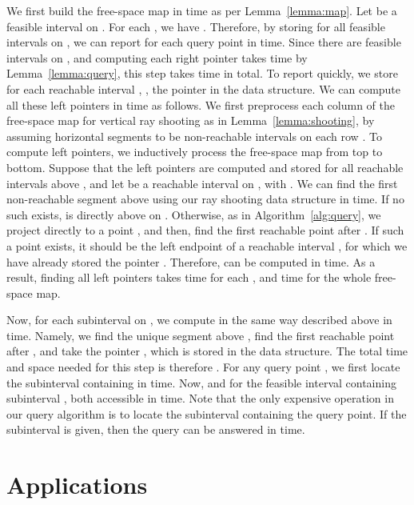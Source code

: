\documentclass[12pt]{dalthesis}
\def\favoritefont{\bfseries \sffamily}
\def\QED{\ensuremath{{\Box}}}
\def\markatright#1{\leavevmode\unskip\nobreak\quad\hspace*{\fill}{#1}}
\newenvironment{proof}
	{\begin{trivlist}\item[\hskip\labelsep{\favoritefont Proof:}]}
	{\markatright{\QED}\end{trivlist}}
\newcommand{\qed}{}
\newcommand{\fs}{free-space }
\begin{document}
\begin{proof}
	We first build the \fs map in  time as per Lemma~\ref{lemma:map}.
	Let  be a feasible interval on .
	For each , we have .
	Therefore, by storing  for all feasible intervals  on ,
	we can report  for each query point  in  time.
	Since there are  feasible intervals on ,
	and computing each right pointer takes  time by Lemma~\ref{lemma:query},
	this step takes  time in total.
	To report  quickly, we store for each reachable interval ,
	, the pointer  in the data structure.
	We can compute all these left pointers in  time as follows.
	We first preprocess each column of the \fs map
	for vertical ray shooting as in Lemma~\ref{lemma:shooting},
	by assuming horizontal segments 
	to be non-reachable intervals on each row . 
	To compute left pointers, we inductively process 
	the \fs map from top to bottom.
	Suppose that the left pointers are computed and stored for 
	all reachable intervals above ,
	and let  be a reachable interval on ,
	with .
	We can find the first non-reachable segment 
	above  using our ray shooting data structure in  time.
	If no such  exists,  is directly above  on .
	Otherwise, as in Algorithm~\ref{alg:query},
	we project  directly to a point , 
	and then, find the first reachable point  after .
	If such a point  exists, it should be the left endpoint of a reachable interval ,
	for which we have already stored the pointer .
	Therefore,  can be computed 
	in  time. As a result, finding all left pointers takes  time for each ,
	and  time for the whole \fs map.
	

	Now, for each subinterval  on ,
	we compute  in the same way described above 
	in  time. Namely, we find the unique segment  above ,
	find the first reachable point  after , 
	and take the pointer , which is stored in the data structure.
	The total time and space needed for this step is therefore .
	For any query point ,
	we first locate the subinterval  containing  in  time.
	Now,  and
	 for the feasible interval  containing subinterval ,
	both accessible in  time.
	Note that the only expensive operation in our query algorithm is
	to locate the subinterval containing the query point.
	If the subinterval is given, 
	then the query can be answered in  time.
	\qed
\end{proof}





\section{Applications} \label{sec:appl}
\end{document}
